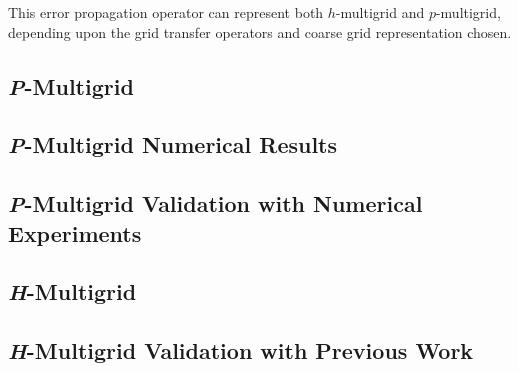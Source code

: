This error propagation operator can represent both $h$-multigrid and $p$-multigrid, depending upon the grid transfer operators and coarse grid representation chosen.

\subsection{{\textit P}-Multigrid}


\subsection{{\textit P}-Multigrid Numerical Results}


\subsection{{\textit P}-Multigrid Validation with Numerical Experiments}


\subsection{{\textit H}-Multigrid}\label{sec:h-multigrid}


\subsection{{\textit H}-Multigrid Validation with Previous Work}

